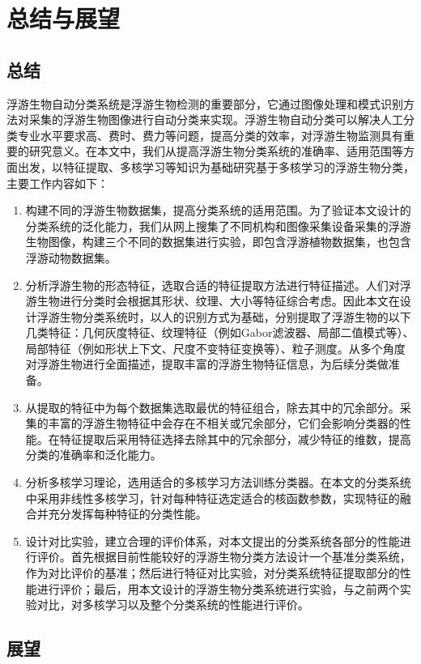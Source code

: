 \chapter{总结与展望}

\section{总结}

浮游生物自动分类系统是浮游生物检测的重要部分，它通过图像处理和模式识别方法对采集的浮游生物图像进行自动分类来实现。浮游生物自动分类可以解决人工分类专业水平要求高、费时、费力等问题，提高分类的效率，对浮游生物监测具有重要的研究意义。在本文中，我们从提高浮游生物分类系统的准确率、适用范围等方面出发，以特征提取、多核学习等知识为基础研究基于多核学习的浮游生物分类，主要工作内容如下：
\begin{enumerate}
\item 构建不同的浮游生物数据集，提高分类系统的适用范围。为了验证本文设计的分类系统的泛化能力，我们从网上搜集了不同机构和图像采集设备采集的浮游生物图像，构建三个不同的数据集进行实验，即包含浮游植物数据集，也包含浮游动物数据集。
\item 分析浮游生物的形态特征，选取合适的特征提取方法进行特征描述。人们对浮游生物进行分类时会根据其形状、纹理、大小等特征综合考虑。因此本文在设计浮游生物分类系统时，以人的识别方式为基础，分别提取了浮游生物的以下几类特征：几何灰度特征、纹理特征（例如Gabor滤波器、局部二值模式等）、局部特征（例如形状上下文、尺度不变特征变换等）、粒子测度。从多个角度对浮游生物进行全面描述，提取丰富的浮游生物特征信息，为后续分类做准备。
\item 从提取的特征中为每个数据集选取最优的特征组合，除去其中的冗余部分。采集的丰富的浮游生物特征中会存在不相关或冗余部分，它们会影响分类器的性能。在特征提取后采用特征选择去除其中的冗余部分，减少特征的维数，提高分类的准确率和泛化能力。
\item 分析多核学习理论，选用适合的多核学习方法训练分类器。在本文的分类系统中采用非线性多核学习，针对每种特征选定适合的核函数参数，实现特征的融合并充分发挥每种特征的分类性能。
\item 设计对比实验，建立合理的评价体系，对本文提出的分类系统各部分的性能进行评价。首先根据目前性能较好的浮游生物分类方法设计一个基准分类系统，作为对比评价的基准；然后进行特征对比实验，对分类系统特征提取部分的性能进行评价；最后，用本文设计的浮游生物分类系统进行实验，与之前两个实验对比，对多核学习以及整个分类系统的性能进行评价。
\end{enumerate}

\section{展望}

